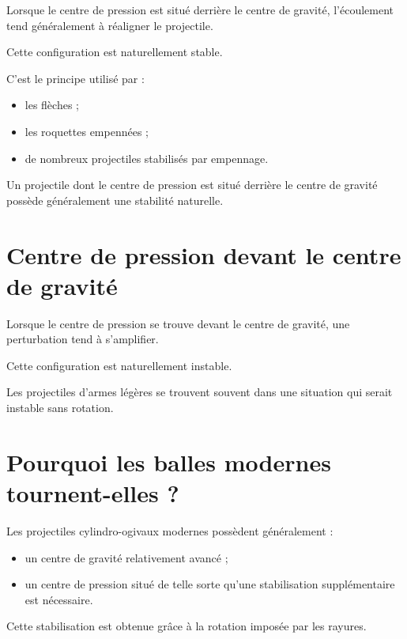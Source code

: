 Lorsque le centre de pression est situé derrière le centre de gravité,
l'écoulement tend généralement à réaligner le projectile.

Cette configuration est naturellement stable.

C'est le principe utilisé par :

\begin{itemize}
    \item les flèches ;
    \item les roquettes empennées ;
    \item de nombreux projectiles stabilisés par empennage.
\end{itemize}

\begin{aretenir}

Un projectile dont le centre de pression est situé derrière le centre de
gravité possède généralement une stabilité naturelle.

\end{aretenir}

\section{Centre de pression devant le centre de gravité}

Lorsque le centre de pression se trouve devant le centre de gravité,
une perturbation tend à s'amplifier.

Cette configuration est naturellement instable.

Les projectiles d'armes légères se trouvent souvent dans une situation qui
serait instable sans rotation.

\section{Pourquoi les balles modernes tournent-elles ?}

Les projectiles cylindro-ogivaux modernes possèdent généralement :

\begin{itemize}
    \item un centre de gravité relativement avancé ;
    \item un centre de pression situé de telle sorte qu'une stabilisation
          supplémentaire est nécessaire.
\end{itemize}

Cette stabilisation est obtenue grâce à la rotation imposée par les rayures.

